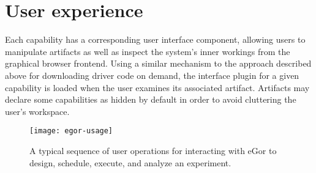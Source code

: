 \documentclass[../thesis]{subfiles}
\begin{document}
\section{User experience}
Each capability has a corresponding user interface component, allowing
users to manipulate artifacts as well as inspect the system's inner
workings from the graphical browser frontend. Using a similar mechanism to
the approach described above for downloading driver code on demand,
the interface plugin for a given capability is loaded when the
user examines its associated artifact. Artifacts may declare some
capabilities as hidden by default in order to avoid cluttering the
user's workspace.

\begin{figure}
  \texttt{[image: egor-usage]}
  \caption[A typical eGor workflow]{
    A typical sequence of user operations for interacting with eGor to
    design, schedule, execute, and analyze an experiment.
    \label{fig:EgorUsage}
  }
\end{figure}
\end{document}

